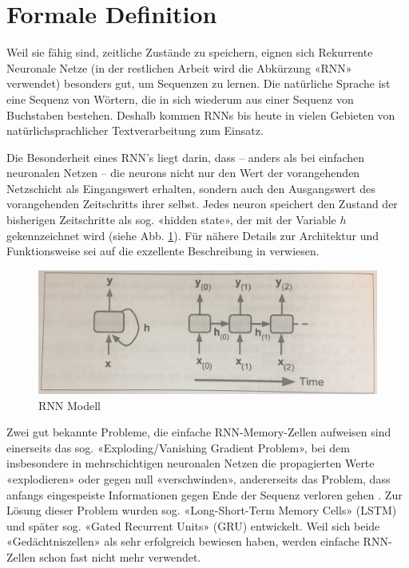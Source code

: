 \section{Formale Definition}
\label{sec:model-definition}

Weil sie fähig sind, zeitliche Zustände zu speichern, eignen sich Rekurrente Neuronale Netze (in der restlichen Arbeit wird die Abkürzung «RNN» verwendet) besonders gut, um Sequenzen zu lernen.
Die natürliche Sprache ist eine Sequenz von Wörtern, die in sich wiederum aus einer Sequenz von Buchstaben bestehen.
Deshalb kommen RNNs bis heute in vielen Gebieten von natürlichsprachlicher Textverarbeitung zum Einsatz.

Die Besonderheit eines RNN's liegt darin, dass – anders als bei einfachen neuronalen Netzen – die \glspl{neuron} nicht nur den Wert der vorangehenden Netzschicht als
Eingangswert erhalten, sondern auch den Ausgangswert des vorangehenden Zeitschritts ihrer selbst.
Jedes \gls{neuron} speichert den Zustand der bisherigen Zeitschritte als sog. «hidden state», der mit der Variable $ h $ gekennzeichnet wird (siehe Abb. \ref{fig:rnn-model-definition}).
Für nähere Details zur Architektur und Funktionsweise sei auf die exzellente Beschreibung in \autocite{geron} verwiesen.

\begin{figure}
    \centering
    \includegraphics[width=0.75\linewidth]{images/model/model-rnn-definition.jpg}
    \caption[RNN Modell]{RNN Modell \autocite{geron}}
    \label{fig:rnn-model-definition}
\end{figure}

Zwei gut bekannte Probleme, die einfache RNN-Memory-Zellen aufweisen sind einerseits das sog. «Exploding/Vanishing Gradient Problem», bei dem insbesondere in mehrschichtigen neuronalen Netzen
die propagierten Werte «explodieren» oder gegen null «verschwinden», andererseits das Problem, dass anfangs eingespeiste Informationen gegen Ende der Sequenz verloren gehen \autocite{geron}.
Zur Lösung dieser Problem wurden sog. «Long-Short-Term Memory Cells» (LSTM)\autocite{lstm} und später sog. «Gated Recurrent Units» (GRU)\autocite{gru} entwickelt.
Weil sich beide «Gedächtniszellen» als sehr erfolgreich bewiesen haben, werden einfache RNN-Zellen schon fast nicht mehr verwendet.

